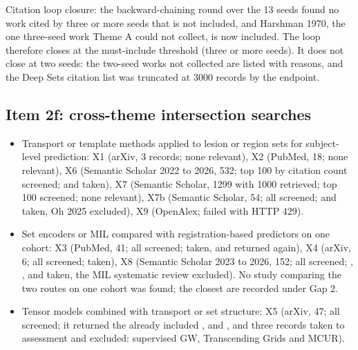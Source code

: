 \documentclass[journal,onecolumn]{IEEEtran}
\begin{document}
Citation loop closure: the backward-chaining round over the 13 seeds found no work cited by three or more seeds that is not included, and Harshman 1970, the one three-seed work Theme A could not collect, is now included. The loop therefore closes at the must-include threshold (three or more seeds). It does not close at two seeds: the two-seed works not collected are listed with reasons, and the Deep Sets citation list was truncated at 3000 records by the endpoint.

\subsection{Item 2f: cross-theme intersection searches}

\begin{itemize}

\item{} Transport or template methods applied to lesion or region sets for subject-level prediction: X1 (arXiv, 3 records; none relevant), X2 (PubMed, 18; none relevant), X6 (Semantic Scholar 2022 to 2026, 532; top 100 by citation count screened; \cite{Ren2025OTSurv} and \cite{Xu2023Representing} taken), X7 (Semantic Scholar, 1299 with 1000 retrieved; top 100 screened; none relevant), X7b (Semantic Scholar, 54; all screened; \cite{Xu2023Multimodal} and \cite{Little2023Associating} taken, Oh 2025 excluded), X9 (OpenAlex; failed with HTTP 429).

\item{} Set encoders or MIL compared with registration-based predictors on one cohort: X3 (PubMed, 41; all screened; \cite{Liu2026Three} taken, and \cite{Karimzadeh2026Revisiting} returned again), X4 (arXiv, 6; all screened; \cite{Islam2026NeuroAPS} taken), X8 (Semantic Scholar 2023 to 2026, 152; all screened; \cite{Collenne2024ReSeT}, \cite{Gacheva2026Multiple}, \cite{Alberb2026Automated} and \cite{Karimzadeh2026Revisiting} taken, the MIL systematic review excluded). No study comparing the two routes on one cohort was found; the closest are recorded under Gap 2.

\item{} Tensor models combined with transport or set structure: X5 (arXiv, 47; all screened; it returned the already included \cite{Biehler2024ANTLER}, \cite{Yan2019Structured} and \cite{Afshar2021SWIFT}, and three records taken to assessment and excluded: supervised GW, Transcending Grids and MCUR).

\end{itemize}
\end{document}
